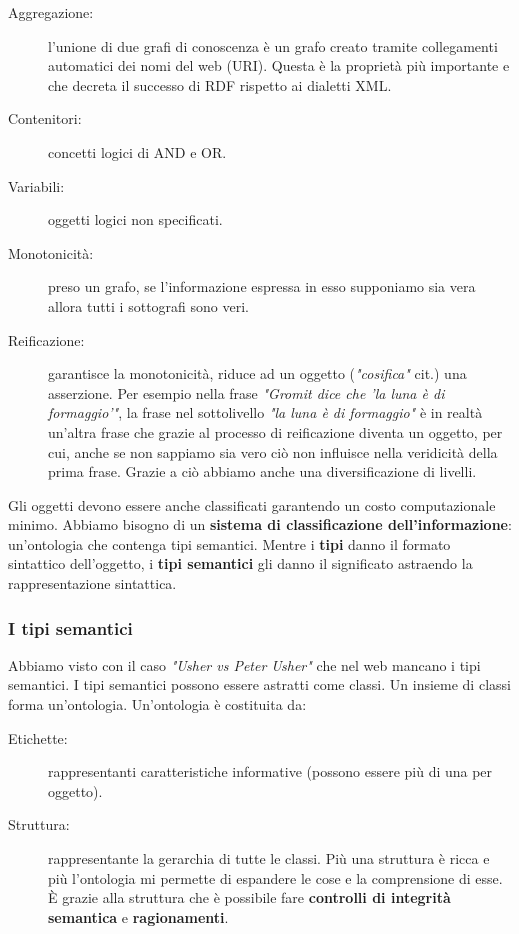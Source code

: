 				\begin{description}
					\item[Aggregazione:] l'unione di due grafi di conoscenza è un grafo creato tramite collegamenti automatici dei nomi del web (URI). Questa è la proprietà più importante e che decreta il successo di RDF rispetto ai dialetti XML. 
					\item[Contenitori:] concetti logici di AND e OR.
					\item[Variabili:] oggetti logici non specificati.
					\item[Monotonicità:] preso un grafo, se l'informazione espressa in esso supponiamo sia vera allora tutti i sottografi sono veri.
					\item[Reificazione:] garantisce la monotonicità, riduce ad un oggetto (\emph{"cosifica"} cit.) una asserzione. Per esempio nella frase \emph{"Gromit dice che 'la luna è di formaggio'"}, la frase nel sottolivello \emph{"la luna è di formaggio"} è in realtà un'altra frase che grazie al processo di reificazione diventa un oggetto, per cui, anche se non sappiamo sia vero ciò non influisce nella veridicità della prima frase. Grazie a ciò abbiamo anche una diversificazione di livelli.
				\end{description}
				
				Gli oggetti devono essere anche classificati garantendo un costo computazionale minimo. Abbiamo bisogno di un \textbf{sistema di classificazione dell'informazione}: un'ontologia che contenga tipi semantici. Mentre i \textbf{tipi} danno il formato sintattico dell'oggetto, i \textbf{tipi semantici} gli danno il significato astraendo la rappresentazione sintattica.
				
			\subsubsection{I tipi semantici}
				Abbiamo visto con il caso \emph{"Usher vs Peter Usher"} che nel web mancano i tipi semantici. I tipi semantici possono essere astratti come classi. Un insieme di classi forma un'ontologia. Un'ontologia è costituita da:
				\begin{description}
					\item[Etichette:] rappresentanti caratteristiche informative (possono essere più di una per oggetto).
					\item[Struttura:] rappresentante la gerarchia di tutte le classi. Più una struttura è ricca e più l'ontologia mi permette di espandere le cose e la comprensione di esse. È grazie alla struttura che è possibile fare \textbf{controlli di integrità semantica} e \textbf{ragionamenti}.
				\end{description}
				
